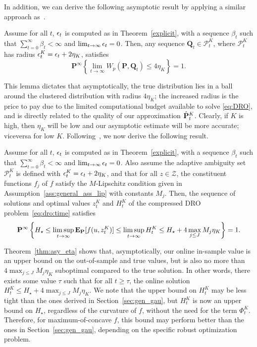 In addition, we can derive the following asymptotic result by applying a similar approach as~\cite[Lemma 3.7]{mohajerin2018data}.

\begin{lemma}\label{lemma:convergence:K}
Assume for all $t$, $\epsilon_t$ is computed as in Theorem~\ref{explicit}, with a sequence $\beta_t$ such that $\sum_{t=0}^\infty \beta_t< \infty$ and $\lim_{t\to\infty}\epsilon_t = 0$. Then, any sequence $\mathbf{Q}_t \in \mathcal{P}^K_t$, where $\mathcal{P}^K_t$ has radius $\epsilon^K_t = \epsilon_t + 2\eta_K$, satisfies
$$
\mathbf{P}^\infty\left\{ \lim_{t \rightarrow \infty } W_p(\mathbf{P}, \mathbf{Q}_t) \leq 4\eta_K\right\} = 1.
$$ 
\end{lemma}

This lemma dictates that asymptotically, the true distribution lies in a ball around the clustered distribution with radius $4\eta_K$; the increased radius is the price to pay due to the limited computational budget available to solve \eqref{eq:DRO}, and is directly related to the quality of our approximation $\hat{{\mathbf P}}^K_t$. Clearly, if $K$ is high, then $\eta_K$ will be low and our asymptotic estimate will be more accurate; viceversa for low $K$.
Following~\cite[Theorem 3.6]{mohajerin2018data}, we now derive the following result. 

\begin{theorem} 
\label{thm:asy_eta}
Assume for all $t$, $\epsilon_t$ is computed as in Theorem~\ref{explicit}, with a sequence $\beta_t$ such that $\sum_{t=0}^\infty \beta_t< \infty$ and $\lim_{t\to\infty}\epsilon_t = 0$. Also assume the adaptive ambiguity set $\mathcal{P}^K_t$ is defined with $\epsilon^K_{t} = \epsilon_{t} + 2\eta_K$, and that for all $z\in \mathcal{Z}$, the constituent functions $f_j$ of $f$ satisfy the $M$-Lipschitz condition given in Assumption~\ref{ass:general_ass_lip} with constants $M_j$.
Then, the sequence of solutions and optimal values $z^K_{t}$ and $H^K_t$ of the compressed \gls{DRO} problem~\eqref{eq:dro:time} satisfies
$$\mathbf{P}^\infty\left\{ H_\star \leq \limsup_{t \rightarrow \infty } \mathbf{E}_{\mathbf P}[f(u,z^K_{t})]\leq \limsup_{t \rightarrow \infty } H^K_t \leq H_\star + 4\max_{j\leq J}M_j\eta_K\right\} = 1.
$$
\end{theorem}

Theorem~\ref{thm:asy_eta} shows that, asymptotically, our online in-sample value is an upper bound on the out-of-sample and true values, but is also no more than $4\max_{j\leq J}M_j\eta_K$ suboptimal compared to the true solution. In other words, there exists some value $\tau$ such that for all $t \geq \tau$, the online solution $H^K_t \leq H_\star + 4\max_{j\leq J}M_j\eta_K$.
We note that the upper bound on $H^K_t$ may be less tight than the ones derived in Section~\ref{sec:gen_gau}, but $H^K_t$ is now an upper bound on $H_\star$, regardless of the curvature of $f$, without the need for the term $\Phi^K_t$. Therefore, for maximum-of-concave $f$, this bound may perform better than the ones in Section~\ref{sec:gen_gau}, depending on the specific robust optimization problem. 

